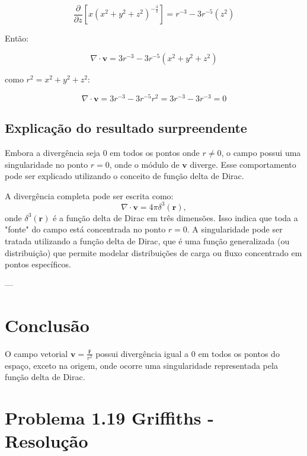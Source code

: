 \documentclass[a4paper,12pt]{article}
\begin{document}
\begin{equation}
    \frac{\partial}{\partial z}\left[x(x^2+y^2+z^2)^{-\frac{3}{2}}\right] = r^{-3} - 3r^{-5}\left(z^2\right)
\end{equation}

Ent\~ao:

\begin{equation}
    \nabla \cdot \mathbf{v} = 3r^{-3} -3r^{-5}\left(x^2+y^2+z^2\right)
\end{equation}

como $r^2 = x^2 + y^2 + z^2$:

\begin{equation}
    \nabla \cdot \mathbf{v} = 3r^{-3} - 3r^{-5}r^2 = 3r^{-3} - 3r^{-3} = 0 
\end{equation}

\subsection*{Explicação do resultado surpreendente}

Embora a divergência seja \( 0 \) em todos os pontos onde \( r \neq 0 \), o campo possui uma singularidade no 
ponto \( r = 0 \), onde o módulo de \( \mathbf{v} \) diverge. Esse comportamento pode ser explicado utilizando 
o conceito de função delta de Dirac. 

A divergência completa pode ser escrita como:
\begin{equation}
\nabla \cdot \mathbf{v} = 4\pi \delta^3(\mathbf{r}),
\end{equation}
onde \( \delta^3(\mathbf{r}) \) é a função delta de Dirac em três dimensões. Isso indica que toda a "fonte" 
do campo está concentrada no ponto \( r = 0 \). A singularidade pode ser tratada utilizando a função delta de Dirac, 
que é uma função generalizada (ou distribuição) que permite modelar distribuições de carga ou fluxo concentrado em 
pontos específicos.

---

\section*{Conclusão}

O campo vetorial \( \mathbf{v} = \frac{\hat{\mathbf{r}}}{r^2} \) possui divergência igual a \( 0 \) em todos os pontos do espaço, 
exceto na origem, onde ocorre uma singularidade representada pela função delta de Dirac.

\newpage
\section*{Problema 1.19 Griffiths - Resolu\c{c}\~ao}
\end{document}
